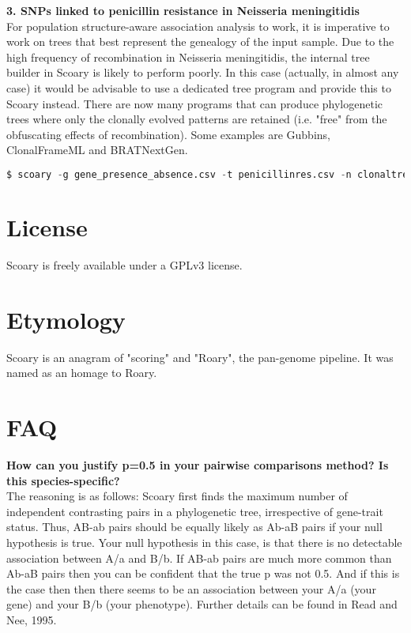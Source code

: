 \documentclass{article}
\begin{document}
    \textbf{3. SNPs linked to penicillin resistance in Neisseria meningitidis} \\

    For population structure-aware association analysis to work, it is imperative to work on trees that best represent the genealogy of the input sample. Due to the high frequency of recombination in Neisseria meningitidis, the internal tree builder in Scoary is likely to perform poorly. In this case (actually, in almost any case) it would be advisable to use a dedicated tree program and provide this to Scoary instead. There are now many programs that can produce phylogenetic trees where only the clonally evolved patterns are retained (i.e. "free" from the obfuscating effects of recombination). Some examples are Gubbins, ClonalFrameML and BRATNextGen. \\
    
    \begin{lstlisting}[language=python, basicstyle=\small]
      $ scoary -g gene_presence_absence.csv -t penicillinres.csv -n clonaltree.nwk
    \end{lstlisting}

  \section{License}
    Scoary is freely available under a GPLv3 license. \\

  \section{Etymology}
    Scoary is an anagram of "scoring" and "Roary", the pan-genome pipeline. It was named as an homage to Roary. \\

  \section{FAQ}
    \textbf{How can you justify p=0.5 in your pairwise comparisons method? Is this species-specific?} \\

    The reasoning is as follows: Scoary first finds the maximum number of independent contrasting pairs in a phylogenetic tree, irrespective of gene-trait status. Thus, AB-ab pairs should be equally likely as Ab-aB pairs if your null hypothesis is true. Your null hypothesis in this case, is that there is no detectable association between A/a and B/b. If AB-ab pairs are much more common than Ab-aB pairs then you can be confident that the true p was not 0.5. And if this is the case then then there seems to be an association between your A/a (your gene) and your B/b (your phenotype). Further details can be found in Read and Nee, 1995. \\
    
\end{document}

